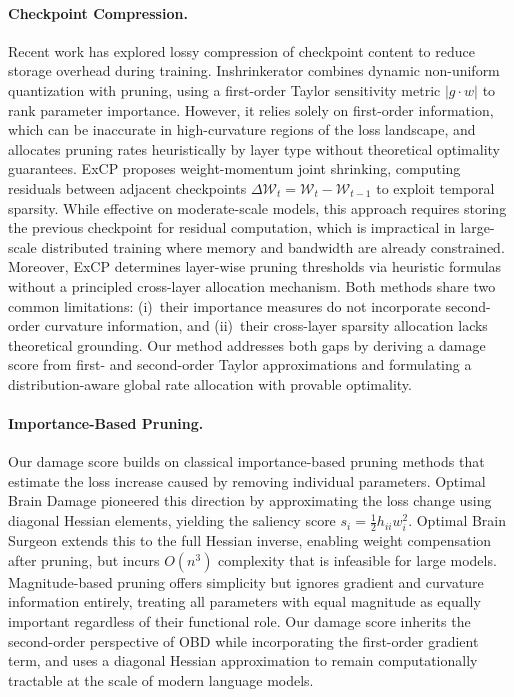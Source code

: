 ﻿\documentclass[11pt]{article}
\begin{document}
\paragraph{Checkpoint Compression.}
Recent work has explored lossy compression of checkpoint content to reduce storage overhead during training.
Inshrinkerator \citep{inshrinkerator} combines dynamic non-uniform quantization with pruning, using a first-order Taylor sensitivity metric $|g \cdot w|$ to rank parameter importance.
However, it relies solely on first-order information, which can be inaccurate in high-curvature regions of the loss landscape, and allocates pruning rates heuristically by layer type without theoretical optimality guarantees.
ExCP \citep{excp} proposes weight-momentum joint shrinking, computing residuals between adjacent checkpoints $\Delta\mathcal{W}_t = \mathcal{W}_t - \mathcal{W}_{t-1}$ to exploit temporal sparsity.
While effective on moderate-scale models, this approach requires storing the previous checkpoint for residual computation, which is impractical in large-scale distributed training where memory and bandwidth are already constrained.
Moreover, ExCP determines layer-wise pruning thresholds via heuristic formulas without a principled cross-layer allocation mechanism.
Both methods share two common limitations: (i)~their importance measures do not incorporate second-order curvature information, and (ii)~their cross-layer sparsity allocation lacks theoretical grounding.
Our method addresses both gaps by deriving a damage score from first- and second-order Taylor approximations and formulating a distribution-aware global rate allocation with provable optimality.

\paragraph{Importance-Based Pruning.}
Our damage score builds on classical importance-based pruning methods that estimate the loss increase caused by removing individual parameters.
Optimal Brain Damage \citep[OBD;][]{obd} pioneered this direction by approximating the loss change using diagonal Hessian elements, yielding the saliency score $s_i = \frac{1}{2} h_{ii} w_i^2$.
Optimal Brain Surgeon \citep[OBS;][]{obs} extends this to the full Hessian inverse, enabling weight compensation after pruning, but incurs $O(n^3)$ complexity that is infeasible for large models.
Magnitude-based pruning \citep{deep-compression} offers simplicity but ignores gradient and curvature information entirely, treating all parameters with equal magnitude as equally important regardless of their functional role.
Our damage score inherits the second-order perspective of OBD while incorporating the first-order gradient term, and uses a diagonal Hessian approximation to remain computationally tractable at the scale of modern language models.
\end{document}
